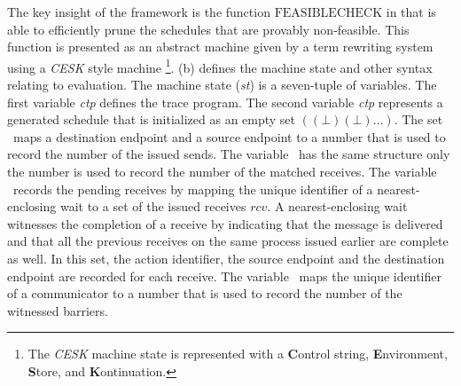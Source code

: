 The key insight of the framework is the function $\mathrm{FEASIBLECHECK}$ in  that is able to efficiently prune the schedules that are provably non-feasible. This function is presented as an abstract machine given by a term rewriting system using a \textit{CESK} style machine \footnote{The \textit{CESK} machine state is represented with a \textbf{C}ontrol string, \textbf{E}nvironment, \textbf{S}tore, and \textbf{K}ontinuation.}. (b) defines the machine state and other syntax relating to evaluation. The machine state (\textit{st}) is a seven-tuple of variables. The first variable \textit{ctp} defines the trace program. The second variable \textit{ctp} represents a generated schedule that is initialized as an empty set $((\bot) (\bot) \ldots)$. The set \epsnd\ maps a destination endpoint and a source endpoint to a number that is used to record the number of the issued sends. The variable \eprcv\ has the same structure only the number is used to record the number of the matched receives. The variable \epwait\ records the pending receives by mapping the unique identifier of a nearest-enclosing wait to a set of the issued receives $\mathit{rcv}$. A nearest-enclosing wait witnesses the completion of a receive by indicating that the message is delivered and that all the previous receives on the same process issued earlier are complete as well. In this set, the action identifier, the source endpoint and the destination endpoint are recorded for each receive. The variable \epbarrier\ maps the unique identifier of a communicator to a number that is used to record the number of the witnessed barriers.

